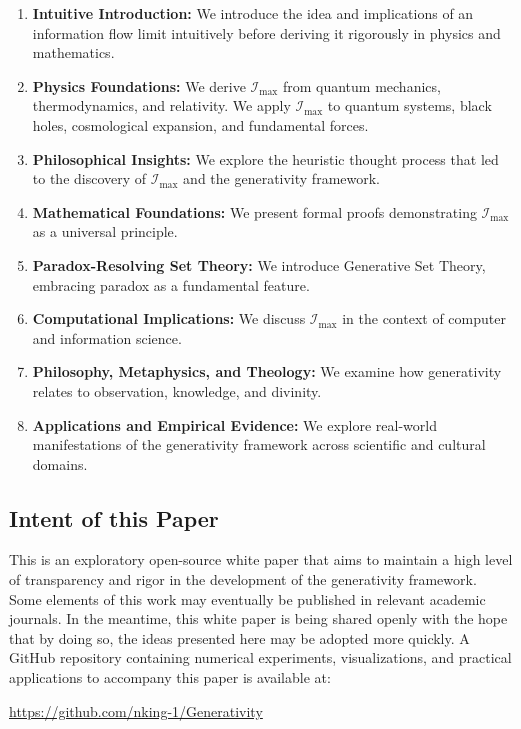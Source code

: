\documentclass[12pt]{article}
\begin{document}
\begin{enumerate}
    \item \textbf{Intuitive Introduction:} We introduce the idea and implications of an information flow limit intuitively before deriving it rigorously in physics and mathematics.
    \item \textbf{Physics Foundations:} We derive $\mathcal{I}_{\text{max}}$ from quantum mechanics, thermodynamics, and relativity. We apply $\mathcal{I}_{\text{max}}$ to quantum systems, black holes, cosmological expansion, and fundamental forces.
    \item \textbf{Philosophical Insights:} We explore the heuristic thought process that led to the discovery of $\mathcal{I}_{\text{max}}$ and the generativity framework.
    \item \textbf{Mathematical Foundations:} We present formal proofs demonstrating $\mathcal{I}_{\text{max}}$ as a universal principle.
    \item \textbf{Paradox-Resolving Set Theory:} We introduce Generative Set Theory, embracing paradox as a fundamental feature.
    \item \textbf{Computational Implications:} We discuss $\mathcal{I}_{\text{max}}$ in the context of computer and information science.
    \item \textbf{Philosophy, Metaphysics, and Theology:} We examine how generativity relates to observation, knowledge, and divinity.
    \item \textbf{Applications and Empirical Evidence:} We explore real-world manifestations of the generativity framework across scientific and cultural domains.
\end{enumerate}

\subsection{Intent of this Paper}

This is an exploratory open-source white paper that aims to maintain a high level of transparency and rigor in the development of the generativity framework. Some elements of this work may eventually be published in relevant academic journals. In the meantime, this white paper is being shared openly with the hope that by doing so, the ideas presented here may be adopted more quickly. A GitHub repository containing numerical experiments, visualizations, and practical applications to accompany this paper is available at:
\begin{center}
    \url{https://github.com/nking-1/Generativity}
\end{center}
\end{document}
